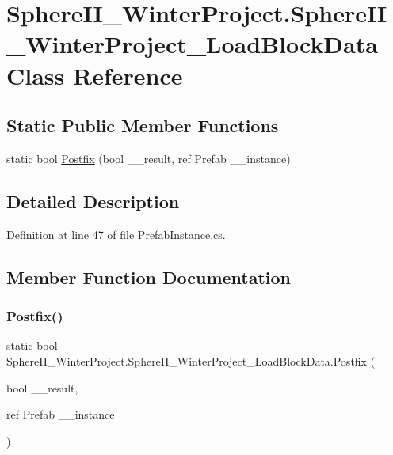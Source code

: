 \hypertarget{class_sphere_i_i___winter_project_1_1_sphere_i_i___winter_project___load_block_data}{}\section{Sphere\+I\+I\+\_\+\+Winter\+Project.\+Sphere\+I\+I\+\_\+\+Winter\+Project\+\_\+\+Load\+Block\+Data Class Reference}
\label{class_sphere_i_i___winter_project_1_1_sphere_i_i___winter_project___load_block_data}
\subsection*{Static Public Member Functions}
\begin{DoxyCompactItemize}
\item 
static bool \mbox{\hyperlink{class_sphere_i_i___winter_project_1_1_sphere_i_i___winter_project___load_block_data_a055ccd7f00bac19f942cb07582a60f02}{Postfix}} (bool \+\_\+\+\_\+result, ref Prefab \+\_\+\+\_\+instance)
\end{DoxyCompactItemize}


\subsection{Detailed Description}


Definition at line 47 of file Prefab\+Instance.\+cs.



\subsection{Member Function Documentation}
\mbox{\label{class_sphere_i_i___winter_project_1_1_sphere_i_i___winter_project___load_block_data_a055ccd7f00bac19f942cb07582a60f02}} 
\subsubsection{\texorpdfstring{Postfix()}{Postfix()}}
{\footnotesize\ttfamily static bool Sphere\+I\+I\+\_\+\+Winter\+Project.\+Sphere\+I\+I\+\_\+\+Winter\+Project\+\_\+\+Load\+Block\+Data.\+Postfix (\begin{DoxyParamCaption}\item[{bool}]{\+\_\+\+\_\+result,  }\item[{ref Prefab}]{\+\_\+\+\_\+instance }\end{DoxyParamCaption})\hspace{0.3cm}{\ttfamily [static]}}



